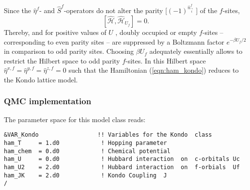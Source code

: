  Since the $\hat{\eta}^{f} $- and $ \hat{S}^{f} $-operators  do not alter the  parity [$(-1)^{\hat{n}^{f}_{\vec{i}}}$ ] of the $f$-sites, 
 \begin{equation}
 	\left[  \hat{\mathcal{H}}, \hat{\mathcal{H}}_{U_f} \right] = 0.
 \end{equation}
 Thereby,  and for positive values of $U$ ,  doubly occupied  or empty $f$-sites -- corresponding to even parity sites -- are suppressed  by a  Boltzmann factor 
 $e^{-\beta U_f/2} $ in comparison to odd parity sites.   Choosing $\beta U_f $ adequately essentially allows to  restrict the Hilbert space to  odd parity $f$-sites.  
 In this Hilbert space $\hat{\eta}^{x,f} = \hat{\eta}^{y,f} =  \hat{\eta}^{z,f} =0$  such that the Hamiltonian (\ref{eqn:ham_kondo}) reduces to the Kondo lattice model. 


\subsubsection*{ QMC implementation } 

The parameter space for this model class  reads: 

\begin{lstlisting}[style=fortran,escapechar=\#,breaklines=true]
&VAR_Kondo                 !! Variables for the Kondo  class
ham_T     = 1.d0            ! Hopping parameter
ham_chem  = 0.d0            ! Chemical potential
ham_U     = 0.d0            ! Hubbard interaction  on  c-orbitals Uc
ham_U2    = 2.d0            ! Hubbard interaction  on  f-orbials  Uf
ham_JK    = 2.d0            ! Kondo Coupling  J
/
\end{lstlisting}



